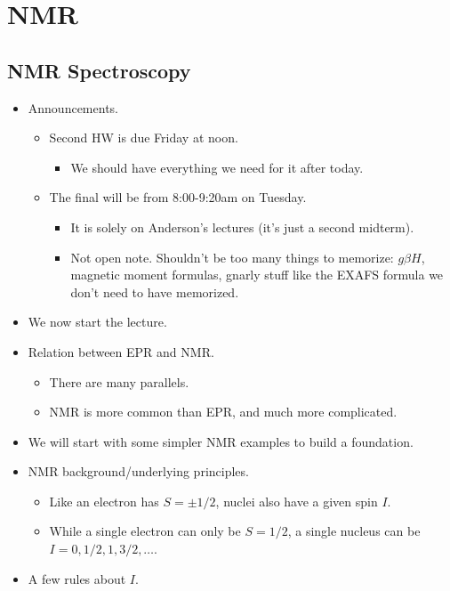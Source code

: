 \documentclass[../notes.tex]{subfiles}
\begin{document}
\chapter{NMR}
\section{NMR Spectroscopy}
\begin{itemize}
    \item {}Announcements.
    \begin{itemize}
        \item Second HW is due Friday at noon.
        \begin{itemize}
            \item We should have everything we need for it after today.
        \end{itemize}
        \item The final will be from 8:00-9:20am on Tuesday.
        \begin{itemize}
            \item It is solely on Anderson's lectures (it's just a second midterm).
            \item Not open note. Shouldn't be too many things to memorize: $g\beta H$, magnetic moment formulas, gnarly stuff like the EXAFS formula we don't need to have memorized.
        \end{itemize}
    \end{itemize}
    \item We now start the lecture.
    \item Relation between EPR and NMR.
    \begin{itemize}
        \item There are many parallels.
        \item NMR is more common than EPR, and much more complicated.
    \end{itemize}
    \item We will start with some simpler NMR examples to build a foundation.
    \item NMR background/underlying principles.
    \begin{itemize}
        \item Like an electron has $S=\pm 1/2$, nuclei also have a given spin $I$.
        \item While a single electron can only be $S=1/2$, a single nucleus can be $I=0,1/2,1,3/2,\dots$.
    \end{itemize}
    \item A few rules about $I$.

\end{itemize}
\end{document}
